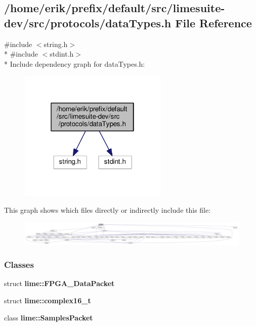 \subsection{/home/erik/prefix/default/src/limesuite-\/dev/src/protocols/data\+Types.h File Reference}
\label{dataTypes_8h}
{\ttfamily \#include $<$string.\+h$>$}\\*
{\ttfamily \#include $<$stdint.\+h$>$}\\*
Include dependency graph for data\+Types.\+h\+:
\nopagebreak
\begin{figure}[H]
\begin{center}
\leavevmode
\includegraphics[width=202pt]{d3/d48/dataTypes_8h__incl}
\end{center}
\end{figure}
This graph shows which files directly or indirectly include this file\+:
\nopagebreak
\begin{figure}[H]
\begin{center}
\leavevmode
\includegraphics[width=350pt]{d7/d55/dataTypes_8h__dep__incl}
\end{center}
\end{figure}
\subsubsection*{Classes}
\begin{DoxyCompactItemize}
\item 
struct {\bf lime\+::\+F\+P\+G\+A\+\_\+\+Data\+Packet}
\item 
struct {\bf lime\+::complex16\+\_\+t}
\item 
class {\bf lime\+::\+Samples\+Packet}
\end{DoxyCompactItemize}
